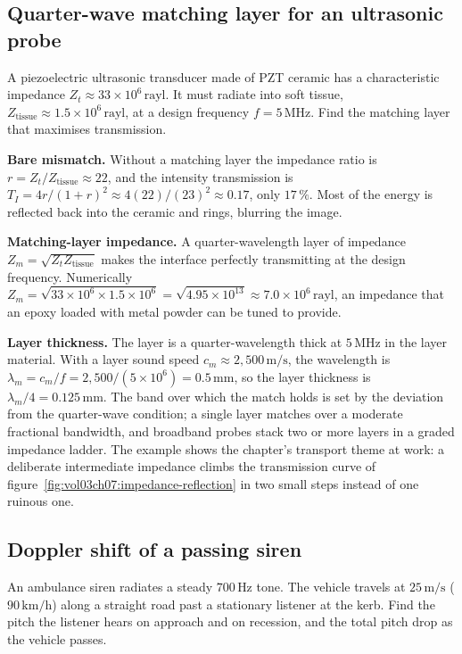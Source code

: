 \subsection{Quarter-wave matching layer for an ultrasonic probe}

A piezoelectric ultrasonic transducer made of PZT ceramic has a
characteristic impedance $Z_t \approx 33\times 10^{6}\,\text{rayl}$.
It must radiate into soft tissue, $Z_{\text{tissue}} \approx 1.5\times
10^{6}\,\text{rayl}$, at a design frequency $f = 5\,\si{\mega\hertz}$.
Find the matching layer that maximises transmission.

\textbf{Bare mismatch.} Without a matching layer the impedance ratio is
$r = Z_t/Z_{\text{tissue}} \approx 22$, and the intensity transmission
is $T_I = 4r/(1+r)^2 \approx 4(22)/(23)^2 \approx 0.17$, only
$17\,\%$. Most of the energy is reflected back into the ceramic and
rings, blurring the image.

\textbf{Matching-layer impedance.} A quarter-wavelength layer of
impedance $Z_m = \sqrt{Z_t Z_{\text{tissue}}}$ makes the interface
perfectly transmitting at the design frequency. Numerically
$Z_m = \sqrt{33\times 10^{6}\times 1.5\times 10^{6}} = \sqrt{4.95\times
10^{13}} \approx 7.0\times 10^{6}\,\text{rayl}$, an impedance that an
epoxy loaded with metal powder can be tuned to provide.

\textbf{Layer thickness.} The layer is a quarter-wavelength thick at
$5\,\si{\mega\hertz}$ in the layer material. With a layer sound speed
$c_m \approx 2{,}500\,\si{\meter\per\second}$, the wavelength is
$\lambda_m = c_m/f = 2{,}500/(5\times 10^{6}) = 0.5\,\si{\milli\meter}$,
so the layer thickness is $\lambda_m/4 = 0.125\,\si{\milli\meter}$. The
band over which the match holds is set by the deviation from the
quarter-wave condition; a single layer matches over a moderate
fractional bandwidth, and broadband probes stack two or more layers in
a graded impedance ladder. The example shows the chapter's transport
theme at work: a deliberate intermediate impedance climbs the
transmission curve of
figure~\ref{fig:vol03ch07:impedance-reflection} in two small steps
instead of one ruinous one.

\subsection{Doppler shift of a passing siren}

An ambulance siren radiates a steady $700\,\si{\hertz}$ tone. The vehicle
travels at $25\,\si{\meter\per\second}$ ($90\,\si{\kilo\meter\per\hour}$)
along a straight road past a stationary listener at the kerb. Find the
pitch the listener hears on approach and on recession, and the total
pitch drop as the vehicle passes.

